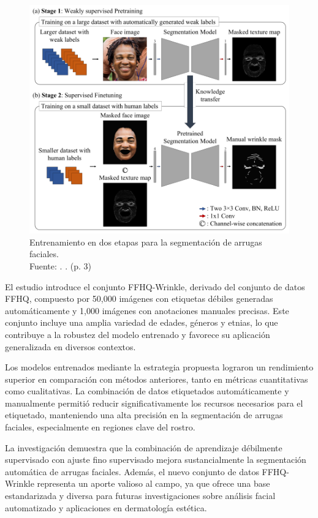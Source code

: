\begin{figure}[!ht]
	\begin{center}
		\includegraphics[width=1\textwidth]{2/figures/metoart9.png}
		\caption[Entrenamiento en dos etapas para la segmentación de arrugas faciales]{Entrenamiento en dos etapas para la segmentación de arrugas faciales.\\
			Fuente: \cite{moon2024dermatology}. . (p. 3)}
		\label{2:fig11}
	\end{center}
\end{figure}

El estudio introduce el conjunto FFHQ-Wrinkle, derivado del conjunto de datos FFHQ, compuesto por 50,000 imágenes con etiquetas débiles generadas automáticamente y 1,000 imágenes con anotaciones manuales precisas. Este conjunto incluye una amplia variedad de edades, géneros y etnias, lo que contribuye a la robustez del modelo entrenado y favorece su aplicación generalizada en diversos contextos.

Los modelos entrenados mediante la estrategia propuesta lograron un rendimiento superior en comparación con métodos anteriores, tanto en métricas cuantitativas como cualitativas. La combinación de datos etiquetados automáticamente y manualmente permitió reducir significativamente los recursos necesarios para el etiquetado, manteniendo una alta precisión en la segmentación de arrugas faciales, especialmente en regiones clave del rostro.

La investigación demuestra que la combinación de aprendizaje débilmente supervisado con ajuste fino supervisado mejora sustancialmente la segmentación automática de arrugas faciales. Además, el nuevo conjunto de datos FFHQ-Wrinkle representa un aporte valioso al campo, ya que ofrece una base estandarizada y diversa para futuras investigaciones sobre análisis facial automatizado y aplicaciones en dermatología estética.

